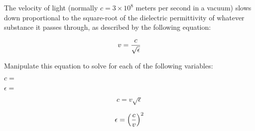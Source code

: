 

The velocity of light (normally $c = 3 \times 10^8$ meters per second in a vacuum) slows down proportional to the square-root of the dielectric permittivity of whatever substance it passes through, as described by the following equation:

$$v = {c \over \sqrt{\epsilon}}$$

Manipulate this equation to solve for each of the following variables:

\vskip 10pt

$c =$

\vskip 10pt

$\epsilon =$

\vskip 10pt







$$c = v \sqrt{\epsilon}$$

$$\epsilon = \left({c \over v}\right)^2$$











